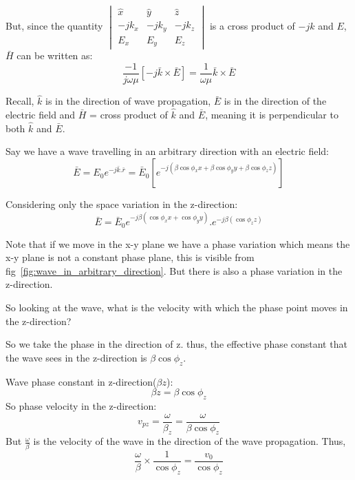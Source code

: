 But, since the quantity $\begin{vmatrix}
\hat{x} & \hat{y} & \hat{z}\\
-jk_x & -jk_y & -jk_z\\
E_{x} & E_{y} & E_{z}
\end{vmatrix}$ is a cross product of $-jk$ and $E$, $\bar{H}$ can be written as:
\begin{equation}
\frac{-1}{j\omega\mu} [-j\bar{k}\times\bar{E}] = \frac{1}{\omega\mu} \bar{k}\times\bar{E}
\end{equation}

Recall, $\hat{k}$ is in the direction of wave propagation,
$\bar{E}$ is in the direction of the electric field and
$\bar{H}$ = cross product of $\hat{k}$ and $\bar{E}$, meaning it is perpendicular to both  $\hat{k}$ and $\bar{E}$.

Say we have a wave travelling in an arbitrary direction with an electric field:
\begin{equation}
\bar{E} = E_0 e^{-j\bar{k}.\bar{r}} = \bar{E}_0[e^{-j(\beta\cos\phi_{x}x + \beta\cos\phi_{y}y + \beta\cos\phi_{z}z)}]
\end{equation}

Considering only the space variation in the z-direction:
\begin{equation}
\bar{E} = \bar{E}_0 e^{-j\beta(\cos\phi_{x}x + \cos\phi_{y}y)}.e^{-j\beta(\cos\phi_{z}z)}
\end{equation}

Note that if we move in the x-y plane we have a phase variation which means the x-y plane is not a constant phase plane, this is visible from fig~\ref{fig:wave_in_arbitrary_direction}. But there is also a phase variation in the z-direction.

So looking at the wave, what is the velocity with which the phase point moves in the z-direction?

So we take the phase in the direction of z. thus, the effective phase constant that the wave sees in the z-direction is $\beta\cos\phi_{z}$.

Wave phase constant in z-direction($\beta z$):
\begin{equation}
\beta z = \beta\cos\phi_{z}
\end{equation}
So phase velocity in the z-direction:
\begin{equation}
v_{pz} = \frac{\omega}{\beta_z} = \frac{\omega}{\beta\cos\phi_{z}}
\end{equation}
But $\frac{\omega}{\beta}$ is the velocity of the wave in the direction of the wave propagation.
Thus,
\begin{equation}
\frac{\omega}{\beta}\times \frac{1}{\cos\phi_{z}} = \frac{v_0}{\cos\phi_{z}}
\end{equation}

